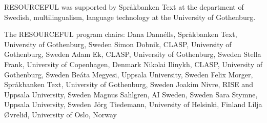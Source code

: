 RESOURCEFUL was supported by Språkbanken Text at the department of Swedish, multilingualism, language technology at the University of Gothenburg. 

The RESOURCEFUL program chairs: 
Dana Dannélls, Språkbanken Text, University of Gothenburg, Sweden
Simon Dobnik, CLASP, University of Gothenburg, Sweden
Adam Ek, CLASP, University of Gothenburg, Sweden
Stella Frank, University of Copenhagen, Denmark 
Nikolai Ilinykh, CLASP, University of Gothenburg, Sweden
Beáta Megyesi, Uppsala University, Sweden
Felix Morger, Språkbanken Text, University of Gothenburg, Sweden
Joakim Nivre, RISE and Uppsala University, Sweden
Magnus Sahlgren, AI Sweden, Sweden
Sara Stymne, Uppsala University, Sweden
Jörg Tiedemann, University of Helsinki, Finland
Lilja Øvrelid, University of Oslo, Norway 
